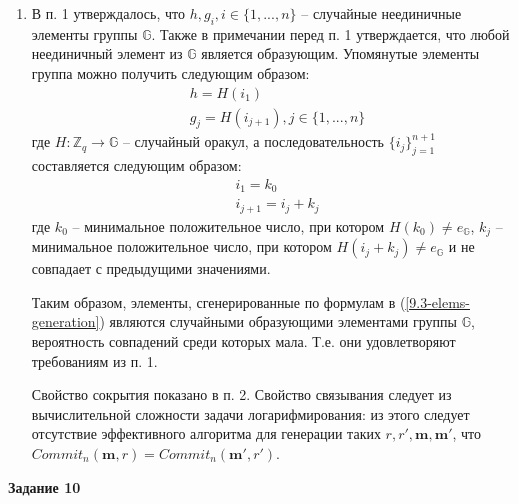 \documentclass[12pt, a4paper]{extarticle}
\newenvironment*{dummyenv}{}{}
\newcommand{\mysection}[1]{
    \addcontentsline{toc}{section}{#1}
    \begin{dummyenv}
        \bfseries\large #1
    \end{dummyenv}
}
\begin{document}
\begin{enumerate}
    \item В п. 1 утверждалось, что $h, g_i, i \in \{1, ...,n\}$ -- случайные неединичные элементы 
        группы $\mathbb{G}$. Также в примечании перед п. 1 утверждается, что любой неединичный 
    	элемент из $\mathbb{G}$ является образующим. Упомянутые элементы группа можно получить 
    	следующим образом:
        \begin{equation}
            \begin{split}
                & h = H(i_1) \\
                & g_j = H(i_{j + 1}), j \in \{1, ..., n\}
            \end{split}
            \label{9.3-elems-generation}
        \end{equation}
        где $H:\mathbb{Z}_q \to \mathbb{G}$ -- случайный оракул, а последовательность 
        $\{i_j\}_{j=1}^{n+1}$ составляется следующим образом:
        \begin{equation*}
            \begin{split}
                & i_1 = k_0 \\
                & i_{j+1} = i_j + k_j
            \end{split}
        \end{equation*}
        где $k_0$ -- минимальное положительное число, при котором $H(k_0) \ne e_{\mathbb{G}}$, 
        $k_j$ -- минимальное положительное число, при котором $H(i_j + k_j) \ne e_{\mathbb{G}}$ и не 
        совпадает с предыдущими значениями.
        
        Таким образом, элементы, сгенерированные по формулам в (\ref{9.3-elems-generation}) являются 
        случайными образующими элементами группы $\mathbb{G}$, вероятность совпадений среди которых 
        мала. Т.е. они удовлетворяют требованиям из п. 1.
        
        Свойство сокрытия показано в п. 2. Свойство связывания следует из вычислительной сложности 
        задачи логарифмирования: из этого следует отсутствие эффективного алгоритма для генерации 
        таких $r, r', \mathbf{m}, \mathbf{m'}$, что $Commit_n(\mathbf{m}, r) = 
        Commit_n(\mathbf{m'}, r')$.
\end{enumerate}

\mysection{Задание 10}
\end{document}

